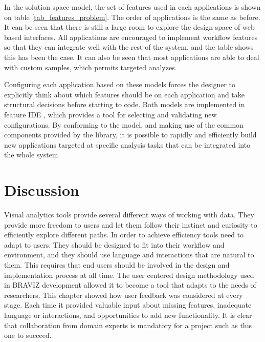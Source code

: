 In the solution space model, the set of features used in each applications is shown on table \ref{tab_features_problem}. The order of applications is the same as before. It can be seen that there is still a large room to explore the design space of web based interfaces. All applications are encouraged to implement workflow features so that they can integrate well with the rest of the system, and the table shows this has been the case. It can also be seen that most applications are able to deal with custom samples, which permits targeted analyzes.

Configuring each application based on these models forces the designer to explicitly think about which features should be on each application and take structural decisions before starting to code. Both models are implemented in feature IDE \autocite{thum_featureide:_2014}, which provides a tool for selecting and validating new configurations. By conforming to the model, and making use of the common components provided by the library, it is possible to rapidly and efficiently build new applications targeted at specific analysis tasks that can be integrated into the whole system.




\section{Discussion}

Visual analytics tools provide several different ways of working with data. They provide more freedom to users and let them follow their instinct and curiosity to efficiently explore different paths. In order to achieve efficiency tools need to adapt to users. They should be designed to fit into their workflow and environment, and they should use language and interactions that are natural to them. This requires that end users should be involved in the design and implementation process at all time. The user centered design methodology used in BRAVIZ development allowed it to become a tool that adapts to the needs of researchers. This chapter showed how user feedback was considered at every stage. Each time it provided valuable input about missing features, inadequate language or interactions, and opportunities to add new functionality. It is clear that collaboration from domain experts is mandatory for a project such as this one to succeed.

